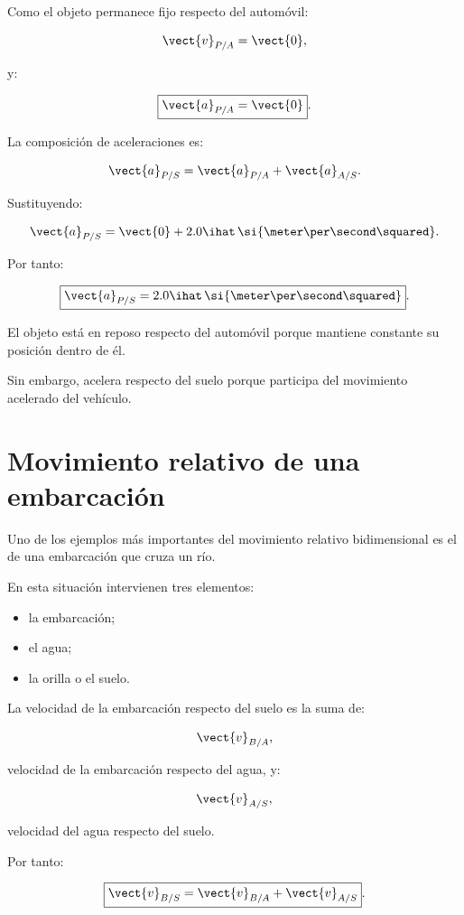 Como el objeto permanece fijo respecto del automóvil:

\[
\vect{v}_{P/A}=\vect{0},
\]

y:

\[
\boxed{
\vect{a}_{P/A}=\vect{0}
}.
\]

La composición de aceleraciones es:

\[
\vect{a}_{P/S}
=
\vect{a}_{P/A}
+
\vect{a}_{A/S}.
\]

Sustituyendo:

\[
\vect{a}_{P/S}
=
\vect{0}
+
2.0\ihat\,
\si{\meter\per\second\squared}.
\]

Por tanto:

\[
\boxed{
\vect{a}_{P/S}
=
2.0\ihat\,
\si{\meter\per\second\squared}
}.
\]

\begin{interpretacion}

El objeto está en reposo respecto del automóvil
porque mantiene constante su posición dentro de él.

Sin embargo, acelera respecto del suelo porque
participa del movimiento acelerado del vehículo.

\end{interpretacion}


\section{Movimiento relativo de una embarcación}

Uno de los ejemplos más importantes del movimiento
relativo bidimensional es el de una embarcación
que cruza un río.

En esta situación intervienen tres elementos:

\begin{itemize}
    \item la embarcación;
    \item el agua;
    \item la orilla o el suelo.
\end{itemize}

La velocidad de la embarcación respecto del suelo
es la suma de:

\[
\vect{v}_{B/A},
\]

velocidad de la embarcación respecto del agua, y:

\[
\vect{v}_{A/S},
\]

velocidad del agua respecto del suelo.

Por tanto:

\[
\boxed{
\vect{v}_{B/S}
=
\vect{v}_{B/A}
+
\vect{v}_{A/S}
}.
\]

